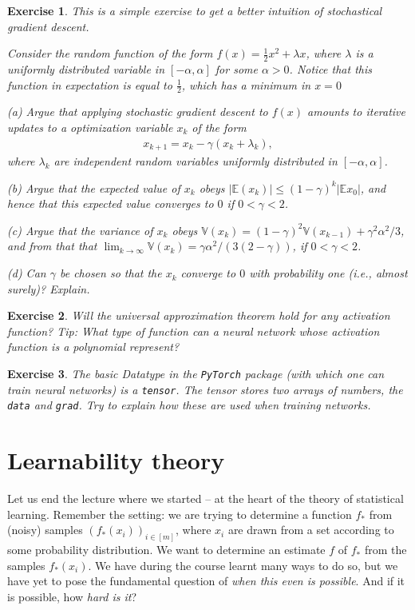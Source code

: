 \documentclass{article}
\newcommand{\erw}{\mathbb{E}} %
\newtheorem{exercise}{Exercise}
\newcommand{\abs}[1]{\vert #1 \vert}
\begin{document}
\begin{exercise}
    This is a simple exercise to get a better intuition of stochastical gradient descent.

    Consider the random function of the form $f(x) = \tfrac{1}{2} x^2 + \lambda x$, where $\lambda$ is a uniformly distributed variable in $[-\alpha,\alpha]$ for some $\alpha>0$. Notice that this function in expectation is equal to $\tfrac{1}{2}$, which has a minimum in $x=0$
    
    (a) Argue that applying stochastic gradient descent to $f(x)$ amounts to iterative updates to a optimization variable $x_k$ of the form
    \begin{align*}
        x_{k+1} = x_k - \gamma(x_k + \lambda_k),
    \end{align*}
    where $\lambda_k$ are independent random variables uniformly distributed in $[-\alpha,\alpha]$.

    (b) Argue that the expected value of $x_{k}$ obeys $\abs{\mathbb{E}(x_k)} \leq (1-\gamma)^k \abs{\erw{x_0}}$, and hence that this expected value converges to $0$ if $0<\gamma<2$.

    (c) Argue that the variance of $x_k$ obeys $\mathbb{V}(x_k) = (1-\gamma)^2 \mathbb{V}(x_{k-1}) +\gamma^2 \alpha^2/3 $, and from that that $\lim_{k \to \infty}\mathbb{V}(x_k) = \gamma\alpha^2/(3(2-\gamma))$, if $0<\gamma<2$. 

    (d) Can $\gamma$ be chosen so that the $x_k$ converge to $0$ with probability one (i.e., almost surely)? Explain.
\end{exercise}

\begin{exercise}
    Will the universal approximation theorem hold for any activation function? \emph{Tip:} What type of function can a neural network whose activation function is a polynomial represent?
\end{exercise}

\begin{exercise}
    The basic Datatype in the \texttt{PyTorch} package (with which one can train neural networks) is a \texttt{tensor}. The tensor stores two arrays of numbers, the \texttt{data} and \texttt{grad}. Try to explain how these are used when training networks.
\end{exercise}


   

\section{Learnability theory}
Let us end the lecture where we started -- at the heart of the theory of statistical learning. Remember the setting: we are trying to determine a function $f_*$ from (noisy) samples $(f_*(x_i))_{i \in [m]}$, where $x_i$ are drawn from a set according to some probability distribution. We want to determine an estimate $f$ of $f_*$ from the samples $f_*(x_i)$. We have during the course learnt many ways to do so, but we have yet to pose the fundamental question of \emph{when this even is possible}. And if it is possible, how \emph{hard is it}? 
\end{document}
